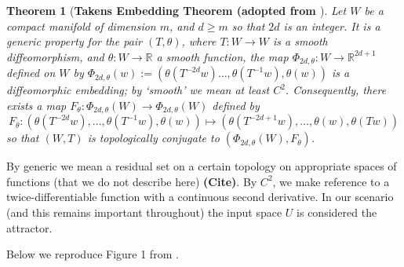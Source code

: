 \documentclass[a4paper,12pt,twoside]{report}
\newtheorem{Theorem}{Theorem}[]
\newcommand{\Ftheta}{\ensuremath{F_\theta}}
\begin{document}
\begin{Theorem} 
	[\bf Takens Embedding Theorem (adopted from \cite{takens1981detecting}] \label{Thm_Takens}
         Let $W$ be a compact manifold of dimension $m$, and $d\ge m$ so that $2d$ is an integer. It is a 
            generic property for the pair $(T, \theta)$,  where $T:W \to W$ is
            a smooth diffeomorphism, and $\theta:W \to \mathbb{R}$ a smooth function, the map $\Phi_{2d,\theta}:W \to \mathbb{R}^{2d+1}$ defined on $W$ by 
            $\Phi_{2d,\theta}(w) := (\theta(T^{-2d}w)\ldots,\theta(T^{-1}w),\theta(w))$
            is a diffeomorphic embedding; by `smooth' we mean at least $C^2$. Consequently, there exists a map $F_\theta: \Phi_{2d,\theta}(W) \to \Phi_{2d,\theta}(W)$ defined by $$F_\theta: (\theta(T^{-2d}w),\ldots,\theta(T^{-1}w),\theta(w)) \mapsto 
            (\theta(T^{-2d+1}w),\ldots,\theta(w),\theta(Tw))$$
           so that $(W,T)$ is topologically conjugate to 
            $(\Phi_{2d,\theta}(W), F_\theta)$.    
\end{Theorem} 

By generic we mean a residual set on a certain topology on appropriate spaces of functions (that we do not describe here) \textbf{(Cite)}. 
By $C^2$, we make reference to a twice-differentiable function  with a continuous second derivative. In our scenario (and this remains important throughout) the input space $U$ is considered the attractor.~\label{attractor_U}

Below we reproduce Figure 1 from \cite{Supp}.


\end{document}
